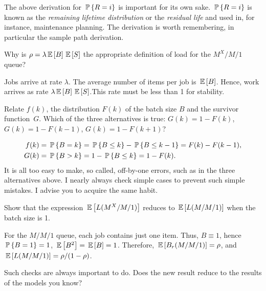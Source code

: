 \begin{remark}
  The above derivation for $\P{R=i}$ is important for its own
  sake. $\P{R=i}$ is known as the \emph{remaining lifetime
      distribution} or the \emph{residual life} and used in, for
    instance, maintenance planning. The derivation is worth
    remembering, in particular the sample path derivation.
\end{remark}

\begin{question}
  Why is $\rho = \lambda \E B \E S$ the appropriate definition
  of load for the $M^X/M/1$ queue?
  \begin{solution}
    Jobs arrive at rate $\lambda$. The average number of items per job
    is $\E B$. Hence, work arrives as rate $\lambda \E B \E S$.This
    rate must be less than 1 for stability.
  \end{solution}
\end{question}


\begin{question}
  Relate $f(k)$, the distribution $F(k)$ of the batch size $B$ and the
  survivor function~$G$. Which of the three alternatives is true:
  $G(k) = 1-F(k)$, $G(k) = 1-F(k-1)$, $G(k) = 1-F(k+1)$?
  \begin{solution}
    \begin{align*}
    f(k) &= \P{B=k} = \P{B\leq k} - \P{B\leq k-1} = F(k)-F(k-1), \\
    G(k) &= \P{B>k} = 1 - \P{B\leq k} = 1-F(k).        
    \end{align*}
    It is all too easy to make, so called, off-by-one errors, such as
    in the three alternatives above.  I nearly always check simple
    cases to prevent such simple mistakes. I advise you to acquire the
    same habit.
  \end{solution}
\end{question}

\begin{question}
  Show that the expression $\E{L(M^X/M/1)}$ reduces to
  $\E{L(M/M/1)}$ when the batch size is 1.  
  \begin{solution}
    For the $M/M/1$ queue, each job contains just one item. Thus,
    $B\equiv 1$, hence $\P{B=1}=1$, $\E{B^2}=\E B =1$. Therefore,
    $\E{B_r(M/M/1)}= \rho$, and $\E{L(M/M/1)}=\rho/(1-\rho)$. 

      Such checks are always important to do. Does the new result
      reduce to the results of the models you know?
  \end{solution}
\end{question}


